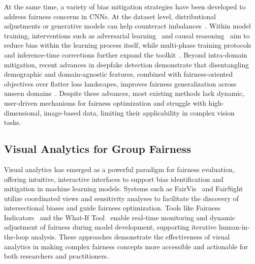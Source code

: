 \documentclass[sigconf]{acmart}
\newcommand{\REVISE}[1]{#1}
\begin{document}

At the same time, a variety of bias mitigation strategies have been developed to address fairness concerns in CNNs. At the dataset level, distributional adjustments or generative models can help counteract imbalances~\cite{DBLP:conf/iccv/ChenJ21}. Within model training, interventions such as adversarial learning~\cite{zhang2018mitigating} and causal reasoning~\cite{byun2025mitigating} aim to reduce bias within the learning process itself, while multi-phase training protocols and inference-time corrections further expand the toolkit~\cite{DBLP:journals/csur/IbrahimS23}. \REVISE{Beyond intra-domain mitigation, recent advances in deepfake detection demonstrate that disentangling demographic and domain-agnostic features, combined with fairness-oriented objectives over flatter loss landscapes, improves fairness generalization across unseen domains~\cite{lin2024fairnessgeneralization}.} Despite these advances, most existing methods lack dynamic, user-driven mechanisms for fairness optimization and struggle with high-dimensional, image-based data, limiting their applicability in complex vision tasks.








\subsection{Visual Analytics for Group Fairness}
Visual analytics has emerged as a powerful paradigm for fairness evaluation, offering intuitive, interactive interfaces to support bias identification and mitigation in machine learning models. Systems such as FairVis~\cite{DBLP:conf/ieeevast/CabreraEHKMC19} and FairSight~\cite{DBLP:journals/tvcg/AhnL20} utilize coordinated views and sensitivity analyses to facilitate the discovery of intersectional biases and guide fairness optimization. Tools like Fairness Indicators~\cite{DBLP:conf/fat/GoyalRHSU22} and the What-If Tool~\cite{DBLP:journals/tvcg/WexlerPBWVW20} enable real-time monitoring and dynamic adjustment of fairness during model development, supporting iterative human-in-the-loop analysis. These approaches demonstrate the effectiveness of visual analytics in making complex fairness concepts more accessible and actionable for both researchers and practitioners.
\end{document}
